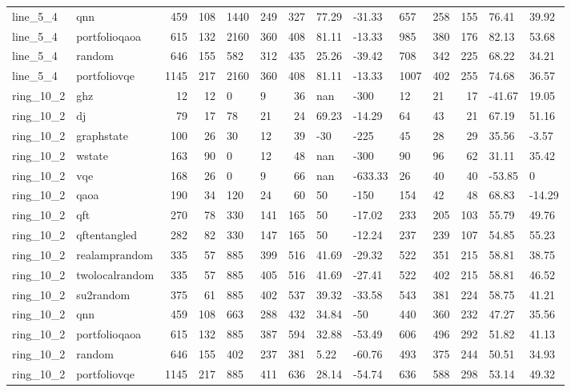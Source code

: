 \begin{longtable}{llrrllrllllrll}
line\_5\_4 & qnn & 459 & 108 & 1440 & 249 & 327 & 77.29 & -31.33 & 657 & 258 & 155 & 76.41 & 39.92 \\
line\_5\_4 & portfolioqaoa & 615 & 132 & 2160 & 360 & 408 & 81.11 & -13.33 & 985 & 380 & 176 & 82.13 & 53.68 \\
line\_5\_4 & random & 646 & 155 & 582 & 312 & 435 & 25.26 & -39.42 & 708 & 342 & 225 & 68.22 & 34.21 \\
line\_5\_4 & portfoliovqe & 1145 & 217 & 2160 & 360 & 408 & 81.11 & -13.33 & 1007 & 402 & 255 & 74.68 & 36.57 \\
ring\_10\_2 & ghz & 12 & 12 & 0 & 9 & 36 & nan & -300 & 12 & 21 & 17 & -41.67 & 19.05 \\
ring\_10\_2 & dj & 79 & 17 & 78 & 21 & 24 & 69.23 & -14.29 & 64 & 43 & 21 & 67.19 & 51.16 \\
ring\_10\_2 & graphstate & 100 & 26 & 30 & 12 & 39 & -30 & -225 & 45 & 28 & 29 & 35.56 & -3.57 \\
ring\_10\_2 & wstate & 163 & 90 & 0 & 12 & 48 & nan & -300 & 90 & 96 & 62 & 31.11 & 35.42 \\
ring\_10\_2 & vqe & 168 & 26 & 0 & 9 & 66 & nan & -633.33 & 26 & 40 & 40 & -53.85 & 0 \\
ring\_10\_2 & qaoa & 190 & 34 & 120 & 24 & 60 & 50 & -150 & 154 & 42 & 48 & 68.83 & -14.29 \\
ring\_10\_2 & qft & 270 & 78 & 330 & 141 & 165 & 50 & -17.02 & 233 & 205 & 103 & 55.79 & 49.76 \\
ring\_10\_2 & qftentangled & 282 & 82 & 330 & 147 & 165 & 50 & -12.24 & 237 & 239 & 107 & 54.85 & 55.23 \\
ring\_10\_2 & realamprandom & 335 & 57 & 885 & 399 & 516 & 41.69 & -29.32 & 522 & 351 & 215 & 58.81 & 38.75 \\
ring\_10\_2 & twolocalrandom & 335 & 57 & 885 & 405 & 516 & 41.69 & -27.41 & 522 & 402 & 215 & 58.81 & 46.52 \\
ring\_10\_2 & su2random & 375 & 61 & 885 & 402 & 537 & 39.32 & -33.58 & 543 & 381 & 224 & 58.75 & 41.21 \\
ring\_10\_2 & qnn & 459 & 108 & 663 & 288 & 432 & 34.84 & -50 & 440 & 360 & 232 & 47.27 & 35.56 \\
ring\_10\_2 & portfolioqaoa & 615 & 132 & 885 & 387 & 594 & 32.88 & -53.49 & 606 & 496 & 292 & 51.82 & 41.13 \\
ring\_10\_2 & random & 646 & 155 & 402 & 237 & 381 & 5.22 & -60.76 & 493 & 375 & 244 & 50.51 & 34.93 \\
ring\_10\_2 & portfoliovqe & 1145 & 217 & 885 & 411 & 636 & 28.14 & -54.74 & 636 & 588 & 298 & 53.14 & 49.32 \\

\end{longtable}
